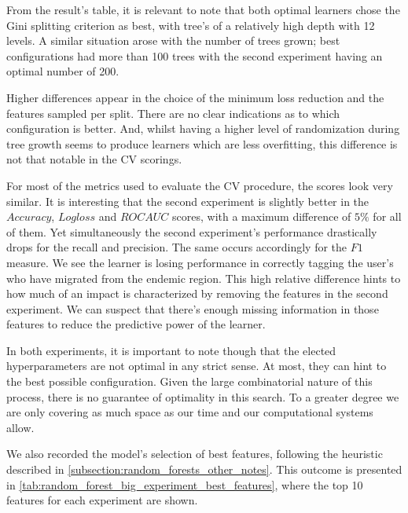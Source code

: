 From the result's table, it is relevant to note that both optimal learners chose the Gini splitting criterion as best, with tree's of a relatively high depth with 12 levels.
A similar situation arose with the number of trees grown; best configurations had more than 100 trees with the second experiment having an optimal number of 200.

Higher differences appear in the choice of the minimum loss reduction and the features sampled per split.
There are no clear indications as to which configuration is better.
And, whilst having a higher level of randomization during tree growth seems to produce learners which are less overfitting, this difference is not that notable in the CV scorings.

For most of the metrics used to evaluate the CV procedure, the scores look very similar.
It is interesting that the second experiment is slightly better in the $Accuracy$, $Logloss$ and $ROC AUC$ scores, with a maximum difference of $5\%$ for all of them.
Yet simultaneously the second experiment's performance drastically drops for the recall and precision.
The same occurs accordingly for the $F1$ measure.
We see the learner is losing performance in correctly tagging the user's who have migrated from the endemic region.
This high relative difference hints to how much of an impact is characterized by removing the features in the second experiment.
We can suspect that there's enough missing information in those features to reduce the predictive power of the learner.

In both experiments, it is important to note though that the elected hyperparameters are not optimal in any strict sense.
At most, they can hint to the best possible configuration.
Given the large combinatorial nature of this process, there is no guarantee of optimality in this search.
To a greater degree we are only covering as much space as our time and our computational systems allow.


We also recorded the model's selection of best features, following the heuristic described in \cref{subsection:random_forests_other_notes}.
This outcome is presented in \cref{tab:random_forest_big_experiment_best_features}, where the top 10 features for each experiment are shown.

